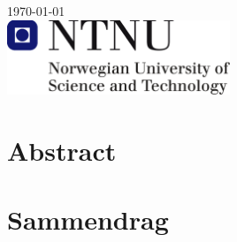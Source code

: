 \documentclass[12pt, a4paper, twoside, openright]{report}
\numberwithin{equation}{chapter}
\numberwithin{figure}{chapter}
\numberwithin{table}{chapter}
\begin{document}
\begin{titlepage}


{\large \today}\\[3cm] %


\includegraphics[width=0.5\textwidth]{Figures/ntnu-logo.png} %
 

\vfill %

\end{titlepage}



\chapter*{Abstract}
\newpage

\chapter*{Sammendrag}
\newpage
\end{document}
